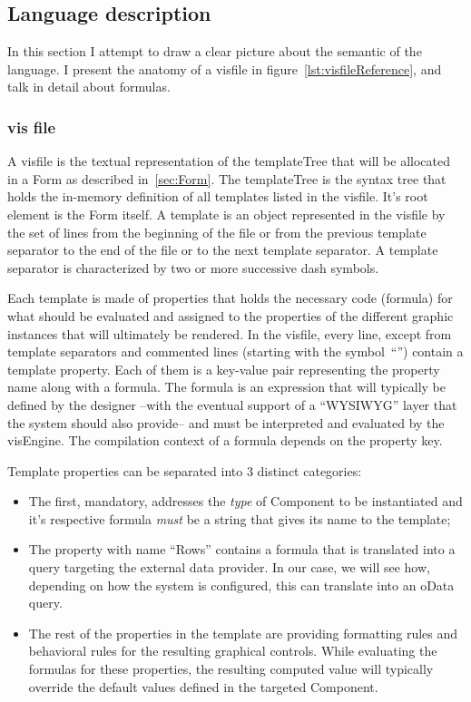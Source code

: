 \subsection{Language description}

In this section I attempt to draw a clear picture about the semantic of the language. I present the anatomy of a visfile in figure~\ref{lst:visfileReference}, and talk in detail about formulas.

\subsubsection{vis file}



A visfile is the textual representation of the templateTree that will be allocated in a Form as described in~\ref{sec:Form}. The templateTree is the syntax tree that holds the in-memory definition of all templates listed in the visfile. It's root element is the Form itself. A template is an object represented in the visfile by the set of lines from the beginning of the file or from the previous template separator to the end of the file or to the next template separator. A template separator is characterized by two or more successive dash symbols.

Each template is made of properties that holds the necessary code (formula) for what should be evaluated and assigned to the properties of the different graphic instances that will ultimately be rendered. In the visfile, every line, except from template separators and commented lines (starting with the symbol~``\textquotesingle'') contain a template property. Each of them is a key-value pair representing the property name along with a formula. The formula is an expression that will typically be defined by the designer --with the eventual support of a ``WYSIWYG'' layer that the system should also provide-- and must be interpreted and evaluated by the visEngine. The compilation context of a formula depends on the property key.

Template properties can be separated into 3 distinct categories:
\begin{itemize}
    \item The first, mandatory, addresses the \emph{type} of Component to be instantiated and it's respective formula \emph{must} be a string that gives its name to the template;
    \item The property with name ``Rows'' contains a formula that is translated into a query targeting the external data provider. In our case, we will see how, depending on how the system is configured, this can translate into an oData query.
    \item The rest of the properties in the template are providing formatting rules and behavioral rules for the resulting graphical controls. While evaluating the formulas for these properties, the resulting computed value will typically override the default values defined in the targeted Component.
\end{itemize}

